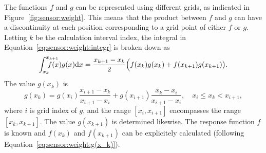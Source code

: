 The functions $f$ and $g$ can be represented using different grids,
as indicated in Figure~\ref{fig:sensor:weight}. This means that the product between $f$ and $g$ can have
a discontinuity at each position corresponding to a grid point of
either $f$ or $g$. Letting $k$ be the calculation interval index,
the integral in Equation~\ref{eq:sensor:weight:integr} is broken down as
\begin{equation}
  \label{eq:sensor:weight:part integr}
  \int_{x_k}^{x_{k+1}}\hspace{-4ex}f(x)g(x)\DiffD x  = 
    \frac{x_{k+1}-x_k}{2}\Bigl( f(x_k) g(x_k) + 
    f(x_{k+1}) g(x_{k+1}) \bigr).
\end{equation}
The value $g(x_k)$ is 
\begin{equation}
  \label{eq:sensor:weight:g(x_k)} 
  g(x_k) = g(x_i)\frac{x_{i+1}-x_k}{x_{i+1}-x_i} + 
           g(x_{i+1})\frac{x_k-x_i}{x_{i+1}-x_i}, \quad 
           x_i \leq x_k < x_{i+1},
\end{equation}
where $i$ is grid index of $g$, and the range $[x_i,x_{i+1}]$
encompasses the range $[x_k,x_{k+1}]$. The value $g(x_{k+1})$ is
determined likewise. The response function $f$ is
known and $f(x_k)$ and $f(x_{k+1})$ can be explicitely calculated
(following Equation~\ref{eq:sensor:weight:g(x_k)}).
   
